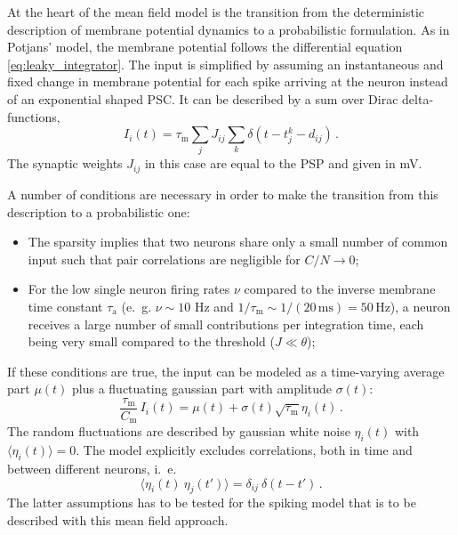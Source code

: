 At the heart of the mean field model
is the transition from the deterministic description of membrane potential 
dynamics to a probabilistic formulation. 
As in Potjans' model, the membrane potential follows
the differential equation \eqref{eq:leaky_integrator}. The input is simplified 
by assuming an instantaneous and fixed change in membrane potential
for each spike arriving at the neuron instead of an exponential shaped PSC.
It can be described by a sum over Dirac delta-functions, 
\begin{equation}
    I_i(t) = \tau_\text{m} \sum_j J_{ij} \sum_k \delta(t - t_j^k - d_{ij}) \,.
    \label{eq:input_const_volt}
\end{equation}
The synaptic weights $J_{ij}$ in this case are equal to the PSP and given in mV.  

A number of conditions are necessary in order to make the transition from 
this description to a probabilistic one:
\begin{itemize}
    \item The sparsity implies that 
        two neurons share only a small number of common input such that pair correlations
        are negligible for $C / N \to 0$; 
    \item For the low single neuron firing rates $\nu$ compared to the 
        inverse membrane time constant $\tau_\text{a}$
        (e.~g. $\nu \sim10$ Hz and $1 / \tau_\text{m} \sim 1 / (20\,\text{ms}) = 50\, \text{Hz}$),
        a neuron receives a large number of small contributions per integration 
        time, each being very small compared to the threshold ($J \ll \theta$);
\end{itemize}
If these conditions are true, the input can be modeled as a time-varying average part
$\mu(t)$ plus a fluctuating gaussian part with amplitude $\sigma(t)$:
\begin{equation}
    \frac{\tau_\text{m}}{C_\text{m}} \, I_i(t) =  \mu(t) + \sigma(t) \sqrt{\tau_\text{m}} \eta_i(t) \, .
    \label{eq:input_random}
\end{equation}
The random fluctuations are described by gaussian white noise $\eta_i(t)$ with 
$\langle  \eta_i(t)\rangle = 0$. The model explicitly excludes correlations, 
both in time and between different neurons, i.~e.
\begin{equation}
    \langle \eta_i(t) \: \eta_j(t') \rangle = \delta_{ij} \: \delta(t - t')	\, . 
    \label{eq:no_correlations}
\end{equation}
The latter assumptions has to be tested for the spiking model
that is to be described with this mean field approach. 

